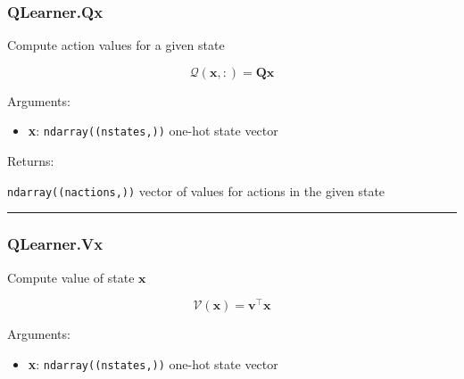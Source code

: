 \hypertarget{qlearner.qx}{%
\subsubsection{QLearner.Qx}\label{qlearner.qx}}

\begin{Shaded}
\begin{Highlighting}[]
\end{Highlighting}
\end{Shaded}

Compute action values for a given state

\[
\mathcal Q(\mathbf x, :) = \mathbf Q \mathbf x
\]

Arguments:

\begin{itemize}
\tightlist
\item
  \textbf{x}: \texttt{ndarray((nstates,))} one-hot state vector
\end{itemize}

Returns:

\texttt{ndarray((nactions,))} vector of values for actions in the given
state

\begin{center}\rule{0.5\linewidth}{\linethickness}\end{center}

\hypertarget{qlearner.vx}{%
\subsubsection{QLearner.Vx}\label{qlearner.vx}}

\begin{Shaded}
\begin{Highlighting}[]
\end{Highlighting}
\end{Shaded}

Compute value of state \(\mathbf x\)

\[
\mathcal V(\mathbf x) = \mathbf v^\top \mathbf x
\]

Arguments:

\begin{itemize}
\tightlist
\item
  \textbf{x}: \texttt{ndarray((nstates,))} one-hot state vector
\end{itemize}

